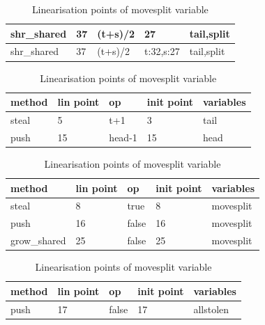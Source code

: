 \documentclass{sig-alternate-br}
\begin{document}
\begin{table}[h]
\begin{subtable}[h]{0.45\textwidth}
\begin{tabular}{|l|l|l|l|l|}
			shr\_shared  & 37                 & (t+s)/2      & 27         & tail,split             \\ \hline
			shr\_shared  & 37                 & (t+s)/2      & t:32,s:27                  & tail,split             \\ \hline
		\end{tabular}
		\caption{Linearisation points of o\_split variable.}
		\label{tab:osplit}
	\end{subtable}
	\hfill
	\begin{subtable}[h]{0.45\textwidth}
		\centering
		\begin{tabular}{|l|l|l|l|l|}
			\hline
			\textbf{method} & \textbf{lin point} & \textbf{op} & \textbf{init point} & \textbf{variables} \\ \hline
			steal           & 5                  & t+1         & 3                   & tail           \\ \hline
			push            & 15                 & head-1      & 15                  & head               \\ \hline
		\end{tabular}
		\caption{Linearisation points of tail variable}
		\label{tab:tail}
	\end{subtable}
	\begin{subtable}[h]{0.45\textwidth}
		\centering
		\begin{tabular}{|l|l|l|l|l|}
			\hline
			\textbf{method} & \textbf{lin point} & \textbf{op} & \textbf{init point} & \textbf{variables} \\ \hline
			steal           & 8                  & true        & 8                   & movesplit          \\ \hline
			push            & 16                 & false       & 16                  & movesplit          \\ \hline
			grow\_shared    & 25                 & false       & 25                  & movesplit          \\ \hline
		\end{tabular}
		\caption{Linearisation points of movesplit variable}
		\label{tab:move}
	\end{subtable}
	\begin{subtable}[h]{0.45\textwidth}
		\centering
		\begin{tabular}{|l|l|l|l|l|}
			\hline
			\textbf{method} & \textbf{lin point} & \textbf{op} & \textbf{init point} & \textbf{variables} \\ \hline
			push            & 17                 & false       & 17                  & allstolen          \\ \hline

\end{tabular}
\end{subtable}
\end{table}
\end{document}
